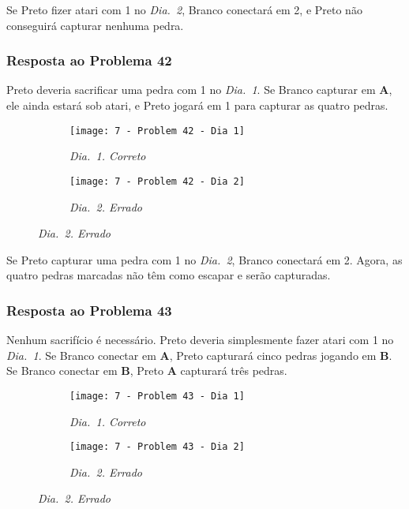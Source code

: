Se Preto fizer atari com 1 no \emph{Dia.\@~2}, Branco conectará em 2, e Preto não conseguirá capturar nenhuma pedra.

\pagebreak

\subsubsection*{Resposta ao Problema 42}

Preto deveria sacrificar uma pedra com 1 no \emph{Dia.\@~1}. Se Branco capturar em \textbf{A}, ele ainda estará sob atari, e Preto jogará em 1 para capturar as quatro pedras.
    
\begin{figure}[h!]
    \centering
    \begin{subfigure}[t]{.425\textwidth}
        \texttt{[image: 7 - Problem 42 - Dia 1]}
        \captionsetup{justification=centering}
        \caption*{\emph{Dia.\@~1. Correto}}
    \end{subfigure}
    \hspace{1cm}
    \begin{subfigure}[t]{.425\textwidth}
        \texttt{[image: 7 - Problem 42 - Dia 2]}
        \captionsetup{justification=centering}
        \caption*{\emph{Dia.\@~2. Errado}}
    \end{subfigure}
\end{figure}

Se Preto capturar uma pedra com 1 no \emph{Dia.\@~2}, Branco conectará em 2. Agora, as quatro pedras marcadas não têm como escapar e serão capturadas.

\pagebreak

\subsubsection*{Resposta ao Problema 43}

Nenhum sacrifício é necessário. Preto deveria simplesmente fazer atari com 1 no \emph{Dia.\@~1}. Se Branco conectar em \textbf{A}, Preto capturará cinco pedras jogando em \textbf{B}. Se Branco conectar em \textbf{B}, Preto \textbf{A} capturará três pedras.
    
\begin{figure}[h!]
    \centering
    \begin{subfigure}[t]{.425\textwidth}
        \texttt{[image: 7 - Problem 43 - Dia 1]}
        \captionsetup{justification=centering}
        \caption*{\emph{Dia.\@~1. Correto}}
    \end{subfigure}
    \hspace{1cm}
    \begin{subfigure}[t]{.425\textwidth}
        \texttt{[image: 7 - Problem 43 - Dia 2]}
        \captionsetup{justification=centering}
        \caption*{\emph{Dia.\@~2. Errado}}
    \end{subfigure}
\end{figure}

